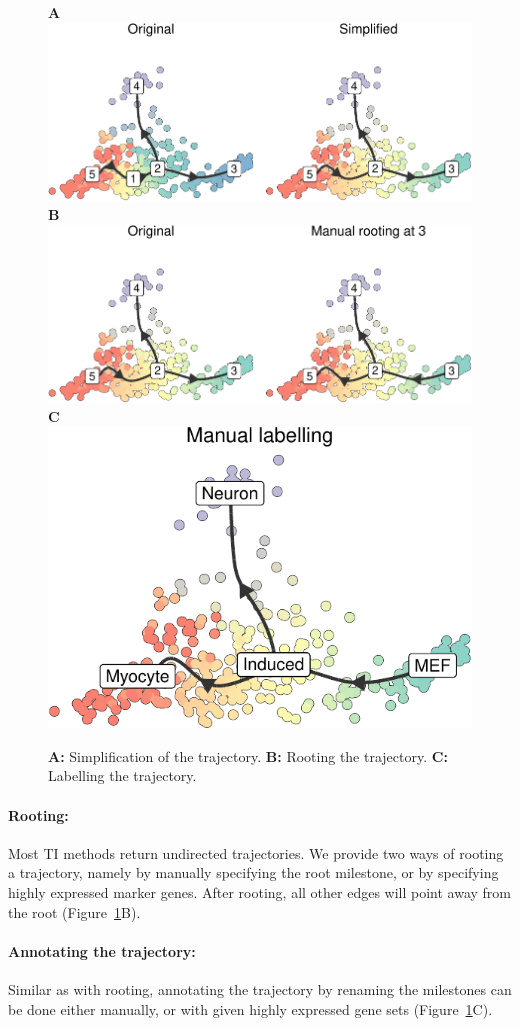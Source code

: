 \begin{figure}[ht!]
	\centering
	\textbf{A}\includegraphics[width=.7\linewidth,valign=t]{manuscript_files/figure-latex/unnamed-chunk-31-1.pdf} \\
	\textbf{B}\includegraphics[width=.7\linewidth,valign=t]{manuscript_files/figure-latex/rootmanual-1.pdf}\\
	\textbf{C}\includegraphics[width=.35\linewidth,valign=t]{manuscript_files/figure-latex/annotatemanual-1.pdf}
	\caption{
		\textbf{A:} Simplification of the trajectory.
		\textbf{B:} Rooting the trajectory.
		\textbf{C:} Labelling the trajectory.
	}
	\label{fig:annot}
\end{figure}




\paragraph{Rooting:} Most TI methods return undirected trajectories. We provide two ways of
rooting a trajectory, namely by manually specifying the root milestone, or by specifying highly expressed marker genes. After rooting, all other edges will point away from the root (Figure~\ref{fig:annot}B).


\paragraph{Annotating the trajectory:} Similar as with rooting, annotating the trajectory by renaming the
milestones can be done either manually, or with given highly expressed
gene sets (Figure~\ref{fig:annot}C).






